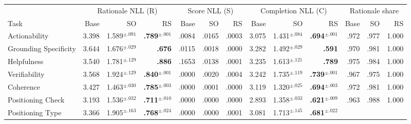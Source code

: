 \begin{table}[t]
\centering
\footnotesize
\setlength{\tabcolsep}{3pt}
\begin{tabular}{l rrr rrr rrr rrr}
\toprule
& \multicolumn{3}{c}{Rationale NLL (R)}
& \multicolumn{3}{c}{Score NLL (S)}
& \multicolumn{3}{c}{Completion NLL (C)}
& \multicolumn{3}{c}{Rationale share} \\
\cmidrule(lr){2-4} \cmidrule(lr){5-7} \cmidrule(lr){8-10} \cmidrule(lr){11-13}
Task & Base & SO & RS
     & Base & SO & RS
     & Base & SO & RS
     & Base & SO & RS \\
\midrule
Actionability           & 3.398 & 1.589$^{\pm.091}$ & \textbf{.789}$^{\pm.001}$
                        & .0084 & .0165 & .0003
                        & 3.075 & 1.431$^{\pm.084}$ & \textbf{.694}$^{\pm.001}$
                        & .972 & .977 & 1.000 \\
Grounding Specificity   & 3.644 & 1.676$^{\pm.029}$ & \textbf{.676}
                        & .0115 & .0018 & .0000
                        & 3.282 & 1.492$^{\pm.029}$ & \textbf{.591}
                        & .970 & .981 & 1.000 \\
Helpfulness             & 3.540 & 1.781$^{\pm.129}$ & \textbf{.886}
                        & .1653 & .0138 & .0001
                        & 3.235 & 1.613$^{\pm.121}$ & \textbf{.789}
                        & .975 & .984 & 1.000 \\
Verifiability           & 3.568 & 1.924$^{\pm.129}$ & \textbf{.840}$^{\pm.001}$
                        & .0000 & .0020 & .0004
                        & 3.242 & 1.735$^{\pm.119}$ & \textbf{.739}$^{\pm.001}$
                        & .967 & .975 & 1.000 \\
Coherence               & 3.427 & 1.463$^{\pm.030}$ & \textbf{.785}$^{\pm.003}$
                        & .0000 & .0001 & .0000
                        & 3.119 & 1.320$^{\pm.025}$ & \textbf{.694}$^{\pm.003}$
                        & .972 & .981 & 1.000 \\
Positioning Check       & 3.193 & 1.536$^{\pm.032}$ & \textbf{.711}$^{\pm.010}$
                        & .0000 & .0000 & .0000
                        & 2.893 & 1.358$^{\pm.033}$ & \textbf{.621}$^{\pm.009}$
                        & .963 & .988 & 1.000 \\
Positioning Type        & 3.366 & 1.905$^{\pm.163}$ & \textbf{.768}$^{\pm.024}$
                        & .0000 & .0000 & .0001
                        & 3.081 & 1.713$^{\pm.145}$ & \textbf{.681}$^{\pm.022}$

\end{tabular}
\end{table}
